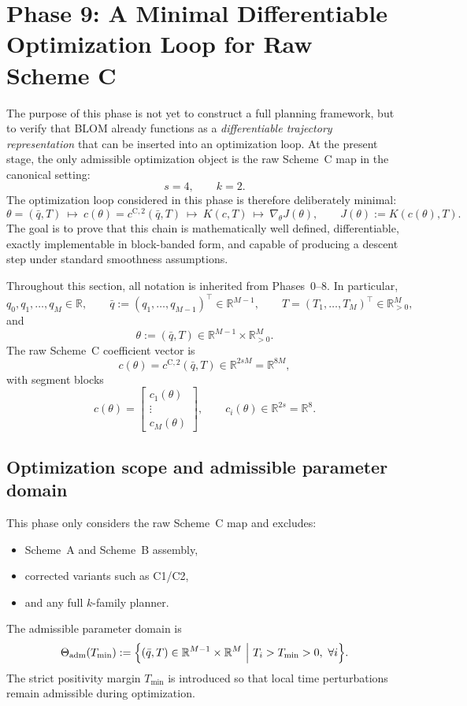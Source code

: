 \section{Phase 9: A Minimal Differentiable Optimization Loop for Raw Scheme C}
\label{sec:phase9_minimal_differentiable_loop}

The purpose of this phase is not yet to construct a full planning framework, but to verify that BLOM already functions as a \emph{differentiable trajectory representation} that can be inserted into an optimization loop.
At the present stage, the only admissible optimization object is the raw Scheme~C map in the canonical setting:
\[
s=4,\qquad k=2.
\]
The optimization loop considered in this phase is therefore deliberately minimal:
\[
\theta=(\bar q,T)
\ \longmapsto\
c(\theta)=c^{\mathrm{C},2}(\bar q,T)
\ \longmapsto\
K(c,T)
\ \longmapsto\
\nabla_\theta J(\theta),
\qquad
J(\theta):=K(c(\theta),T).
\]
The goal is to prove that this chain is mathematically well defined, differentiable, exactly implementable in block-banded form, and capable of producing a descent step under standard smoothness assumptions.

Throughout this section, all notation is inherited from Phases~0--8.
In particular,
\[
q_0,q_1,\dots,q_M\in\mathbb R,
\qquad
\bar q:=(q_1,\dots,q_{M-1})^\top\in\mathbb R^{M-1},
\qquad
T=(T_1,\dots,T_M)^\top\in\mathbb R_{>0}^M,
\]
and
\[
\theta:=(\bar q,T)\in\mathbb R^{M-1}\times \mathbb R_{>0}^{M}.
\]
The raw Scheme~C coefficient vector is
\[
c(\theta)=c^{\mathrm{C},2}(\bar q,T)\in\mathbb R^{2sM}=\mathbb R^{8M},
\]
with segment blocks
\[
c(\theta)=
\begin{bmatrix}
c_1(\theta)\\
\vdots\\
c_M(\theta)
\end{bmatrix},
\qquad
c_i(\theta)\in\mathbb R^{2s}=\mathbb R^8.
\]

\subsection{Optimization scope and admissible parameter domain}
\label{subsec:phase9_scope}

This phase only considers the raw Scheme~C map and excludes:
\begin{itemize}
    \item Scheme~A and Scheme~B assembly,
    \item corrected variants such as C1/C2,
    \item and any full \(k\)-family planner.
\end{itemize}
The admissible parameter domain is
\begin{equation}
\label{eq:phase9_theta_adm}
\Theta_{\mathrm{adm}}(T_{\min})
:=
\Bigl\{
(\bar q,T)\in \mathbb R^{M-1}\times \mathbb R^M
\ \Big|\
T_i>T_{\min}>0,\ \forall i
\Bigr\}.
\end{equation}
The strict positivity margin \(T_{\min}\) is introduced so that local time perturbations remain admissible during optimization.

